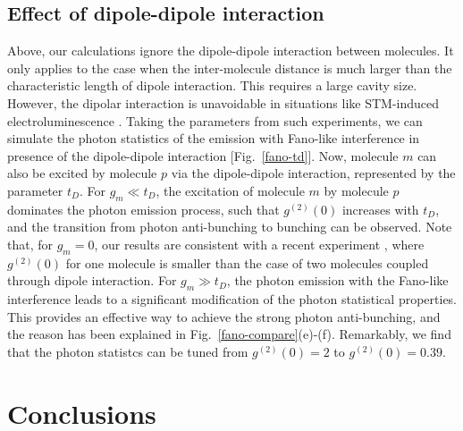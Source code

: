 \documentclass[aps,prb,
superscriptaddress,
,twocolumn
,floatfix,footinbib,longbibliography,
]{revtex4-2}
\newcommand{\revision}[1]{{\color{blue}{#1}}}
\begin{document}
 \subsection{Effect of dipole-dipole interaction}
 Above, our calculations ignore the dipole-dipole interaction between molecules. It only applies to the case when the inter-molecule distance is much larger than the characteristic length of dipole interaction. This requires a large cavity size. However, the dipolar interaction is unavoidable in situations like STM-induced electroluminescence \cite{zhang2016visualizing,PhysRevLett.122.233901}. Taking the parameters from such experiments, we can simulate the photon statistics of the emission with Fano-like interference in presence of the dipole-dipole interaction [Fig.~\ref{fano-td}]. Now, molecule $m$ can also be excited by molecule $p$ via the dipole-dipole interaction, represented by the parameter $t_{D}$. For $g_{m}\ll t_{D}$, the excitation of molecule $m$ by molecule $p$ dominates the photon emission process, such that $g^{(2)}(0)$ increases with $t_{D}$, and the transition from photon anti-bunching to bunching can be observed. Note that, for $g_{m}=0$, our results are consistent with a recent experiment \cite{PhysRevLett.122.233901}, where $g^{(2)}(0)$ for one molecule is smaller than the case of two molecules coupled through dipole interaction. For $g_{m}\gg t_{D}$, the photon emission with the Fano-like interference leads to a significant modification of the photon statistical properties. This provides an effective way to achieve the strong photon anti-bunching, and the reason has been explained in Fig.~\ref{fano-compare}(e)-(f). Remarkably, we find that the photon statistcs can be tuned from $g^{(2)}(0)=2$ to $g^{(2)}(0)=0.39$.


\section{Conclusions}
\revision{In summary, we provide unambiguous theoretical evidence for the role of the Fano-like interference effect on photon statistics in coupled molecule-cavity systems driven by electrical pumping. Control of photon statistics thus becomes possible by selectively electrical driving, even in the presence of the direct dipolar coupling between molecules. This way of achieving on-demand single photon emission using quantum interference can be realized in electrically biased STM-molecule junctions.}


\end{document}
